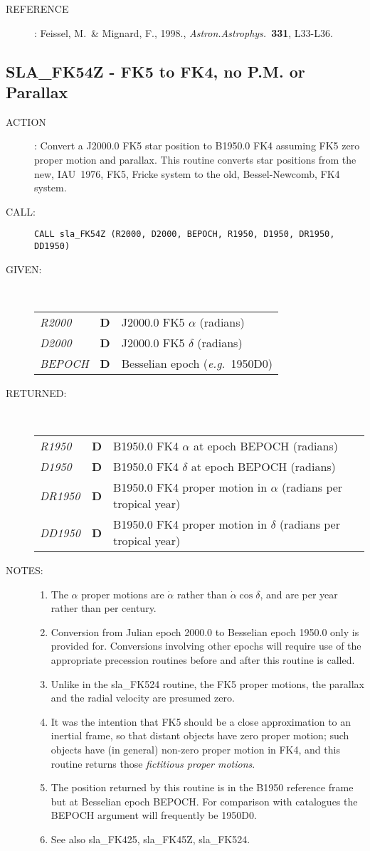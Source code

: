 \documentclass[11pt,twoside]{article}
\newcommand{\xlabel}[1]{}
\newcommand{\routine}[3]
{\hbadness=10000
  \vbox
  {
    \rule{\textwidth}{0.3mm}\\
    {\Large {\bf #1} \hfill #2 \hfill {\bf #1}}\\
    \setlength{\oldspacing}{\topsep}
    \setlength{\topsep}{0.3ex}
    \begin{description}
      #3
    \end{description}
    \setlength{\topsep}{\oldspacing}
  }
}
\renewcommand{\routine}[3]
   {
      \subsection{#1\xlabel{#1} - #2\label{#1}}
       \begin{description}
         #3
       \end{description}
   }
\newcommand{\action}[1]
{\item[ACTION]: #1}
\newcommand{\action}[1]
   {\item[ACTION:] #1}
\newcommand{\call}[1]
{\item[CALL]: \hspace{0.4em}{\tt #1}}
\newlength{\oldspacing}
\renewcommand{\call}[1]
   {
    \item[CALL:] {\tt #1}
   }
\newcommand{\args}[2]
{
  \goodbreak
  \setlength{\oldspacing}{\topsep}
  \setlength{\topsep}{0.3ex}
  \begin{description}
  \item[#1]:\\[1.5ex]
    \begin{tabular}{p{7em}p{6em}p{22em}}
      #2
    \end{tabular}
  \end{description}
  \setlength{\topsep}{\oldspacing}
}
\renewcommand{\args}[2]
   {
     \begin{description}
        \item[#1:]\\
        \begin{tabular}{p{7em}p{6em}l}
           #2
        \end{tabular}
     \end{description}
   }
\newcommand{\spec}[3]
{
  {\em {#1}} & {\bf \mbox{#2}} & {#3}
}
\newcommand{\notes}[1]
{
  \goodbreak
  \setlength{\oldspacing}{\topsep}
  \setlength{\topsep}{0.3ex}
  \begin{description}
    \item[NOTES]:
        #1
  \end{description}
  \setlength{\topsep}{\oldspacing}
}
\renewcommand{\notes}[1]
   {
      \begin{description}
         \item[NOTES:]
            #1
      \end{description}
   }
\newcommand{\aref}[1]
{
  \goodbreak
  \setlength{\oldspacing}{\topsep}
  \setlength{\topsep}{0.3ex}
  \begin{description}
    \item[REFERENCE]:
        #1
  \end{description}
  \setlength{\topsep}{\oldspacing}
}
\newcommand{\aref}[1]
   {
     \begin{description}
       \item[REFERENCE:]
           #1
     \end{description}
   }
\begin{document}
\aref {Feissel, M.\ \& Mignard, F., 1998.,  {\it Astron.Astrophys.}\
       {\bf 331}, L33-L36.}
\routine{SLA\_FK54Z}{FK5 to FK4, no P.M. or Parallax}
{
 \action{Convert a J2000.0 FK5 star position to B1950.0 FK4 assuming
         FK5 zero proper motion and parallax.
         This routine converts star positions from the new, IAU~1976,
         FK5, Fricke system to the old, Bessel-Newcomb, FK4 system.}
 \call{CALL sla\_FK54Z (R2000, D2000, BEPOCH, R1950, D1950, DR1950, DD1950)}
}
\args{GIVEN}
{
 \spec{R2000}{D}{J2000.0 FK5 $\alpha$ (radians)} \\
 \spec{D2000}{D}{J2000.0 FK5 $\delta$ (radians)} \\
 \spec{BEPOCH}{D}{Besselian epoch ({\it e.g.}\ 1950D0)}
}
\args{RETURNED}
{
 \spec{R1950}{D}{B1950.0 FK4 $\alpha$ at epoch BEPOCH (radians)} \\
 \spec{D1950}{D}{B1950.0 FK4 $\delta$ at epoch BEPOCH (radians)} \\
 \spec{DR1950}{D}{B1950.0 FK4 proper motion in $\alpha$
                              (radians per tropical year)} \\
 \spec{DD1950}{D}{B1950.0 FK4 proper motion in $\delta$
                              (radians per tropical year)}
}
\notes
{
 \begin{enumerate}
  \item The $\alpha$ proper motions are $\dot{\alpha}$ rather than
        $\dot{\alpha}\cos\delta$, and are per year rather than per century.
  \item Conversion from Julian epoch 2000.0 to Besselian epoch 1950.0
        only is provided for.  Conversions involving other epochs will
        require use of the appropriate precession routines before and
        after this routine is called.
  \item Unlike in the sla\_FK524 routine, the FK5 proper motions, the
        parallax and the radial velocity are presumed zero.
  \item It was the intention that FK5 should be a close approximation
        to an inertial frame, so that distant objects have zero proper
        motion;  such objects have (in general) non-zero proper motion
        in FK4, and this routine returns those {\it fictitious proper
        motions}.
  \item The position returned by this routine is in the B1950
        reference frame but at Besselian epoch BEPOCH.  For
        comparison with catalogues the BEPOCH argument will
        frequently be 1950D0.
  \item See also sla\_FK425, sla\_FK45Z, sla\_FK524.
 \end{enumerate}
}
\end{document}
